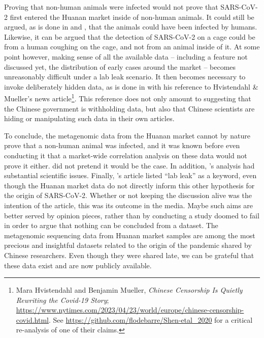 \documentclass[11pt]{article}
\def \sct {\mbox{SARS-CoV-2}}
\begin{document}
Proving that non-human animals were infected would not prove that \sct{} first entered the Huanan market inside of non-human animals. It could still be argued, as is done in \citet{Liu2023Nature} and \citet{Bloom2023VE}, that the animals could have been infected by humans. Likewise, it can be argued that the detection of \sct{} on a cage could be from a human coughing on the cage, and not from an animal inside of it. At some point however, making sense of all the available data -- including a feature not discussed yet, the distribution of early cases around the market \citep{Worobey2022Science} -- becomes unreasonably difficult under a lab leak scenario. It then becomes necessary to invoke deliberately hidden data, as is done in \citet{Bloom2023VE} with his reference to Hvistendahl \& Mueller's news article\footnote{Mara Hvistendahl and Benjamin Mueller, \textit{Chinese Censorship Is Quietly Rewriting the Covid-19 Story}; \url{https://www.nytimes.com/2023/04/23/world/europe/chinese-censorship-covid.html}. See \url{https://github.com/flodebarre/Shen-etal_2020} for a critical re-analysis of one of their claims.}. This reference does not only amount to suggesting that the Chinese government is withholding data, but also that Chinese scientists are hiding or manipulating such data in their own articles. 

To conclude, the metagenomic data from the Huanan market cannot by nature prove that a non-human animal was infected, and it was known before even conducting it that a market-wide correlation analysis on these data would not prove it either. \citet{ACC2023Zenodo} did not pretend it would be the case. In addition, \citet{Bloom2023VE}'s analysis had substantial scientific issues. Finally, \citet{Bloom2023VE}'s article listed ``lab leak'' as a keyword, even though the Huanan market data do not directly inform this other hypothesis for the origin of \sct{}. Whether or not keeping the discussion alive was the intention of the article, this was its outcome in the media. Maybe such aims are better served by opinion pieces, rather than by conducting a study doomed to fail in order to argue that nothing can be concluded from a dataset. The metagenomic sequencing data from Huanan market samples are among the most precious and insightful datasets related to the origin of the pandemic shared by Chinese researchers. Even though they were shared late, we can be grateful that these data exist and are now publicly available.        
\end{document}

